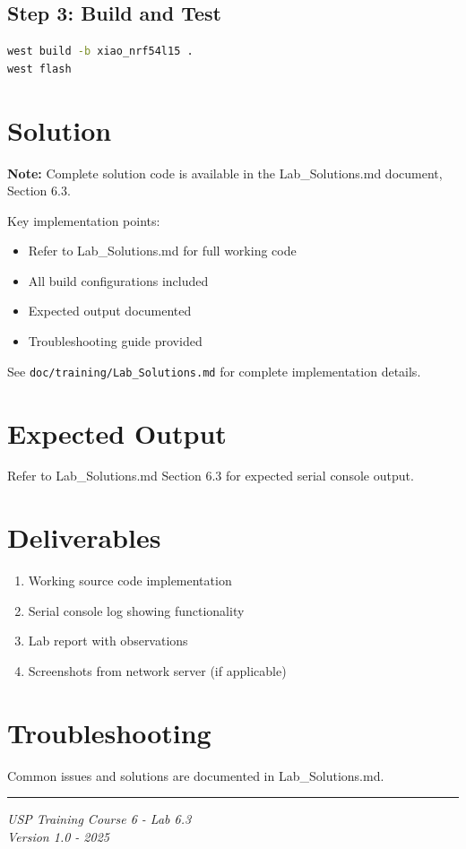 \documentclass[11pt,a4paper]{article}
\begin{document}
\subsection{Step 3: Build and Test}
\begin{lstlisting}[language=bash]
west build -b xiao_nrf54l15 .
west flash
\end{lstlisting}

\section{Solution}

\begin{solutionbox}
\textbf{Note:} Complete solution code is available in the Lab\_Solutions.md document, Section 6.3.

Key implementation points:
\begin{itemize}
    \item Refer to Lab\_Solutions.md for full working code
    \item All build configurations included
    \item Expected output documented
    \item Troubleshooting guide provided
\end{itemize}

See \texttt{doc/training/Lab\_Solutions.md} for complete implementation details.
\end{solutionbox}

\section{Expected Output}

Refer to Lab\_Solutions.md Section 6.3 for expected serial console output.

\section{Deliverables}

\begin{enumerate}[itemsep=10pt]
    \item Working source code implementation
    \item Serial console log showing functionality
    \item Lab report with observations
    \item Screenshots from network server (if applicable)
\end{enumerate}

\section{Troubleshooting}

Common issues and solutions are documented in Lab\_Solutions.md.

\vfill
\noindent\rule{\textwidth}{0.4pt}
\begin{center}
\textit{USP Training Course 6 - Lab 6.3}\\
\textit{Version 1.0 - 2025}
\end{center}
\end{document}
